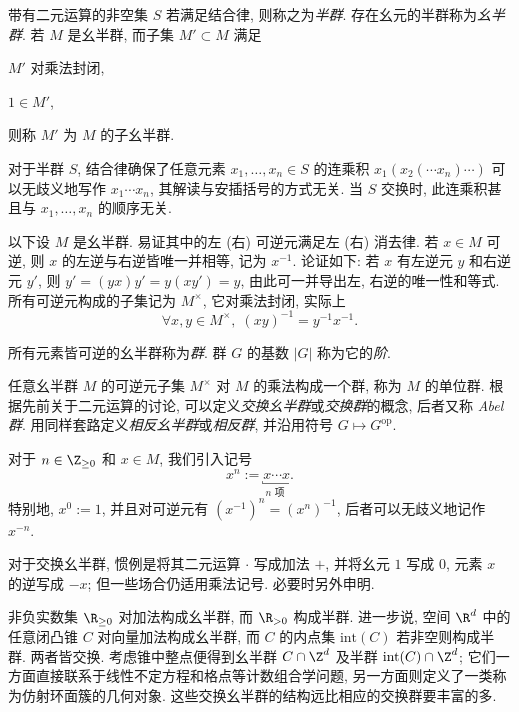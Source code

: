 \begin{definition}[半群与幺半群]\label{def:monoid}
	带有二元运算的非空集 $S$ 若满足结合律, 则称之为\emph{半群}. 存在幺元的半群称为\emph{幺半群}. 若 $M$ 是幺半群, 而子集 $M' \subset M$ 满足
	\begin{inparaenum}[(i)]
		\item $M'$ 对乘法封闭,
		\item $1 \in M'$,
	\end{inparaenum}
	则称 $M'$ 为 $M$ 的子幺半群.
\end{definition}

对于半群 $S$, 结合律确保了任意元素 $x_1, \ldots, x_n \in S$ 的连乘积 $x_1(x_2 (\cdots x_n)\cdots)$ 可以无歧义地写作 $x_1 \cdots x_n$, 其解读与安插括号的方式无关. 当 $S$ 交换时, 此连乘积甚且与 $x_1, \ldots, x_n$ 的顺序无关.

以下设 $M$ 是幺半群. 易证其中的左 (右) 可逆元满足左 (右) 消去律. 若 $x \in M$ 可逆, 则 $x$ 的左逆与右逆皆唯一并相等, 记为 $x^{-1}$. 论证如下: 若 $x$ 有左逆元 $y$ 和右逆元 $y'$, 则 $y' = (yx)y' =y (xy') = y$, 由此可一并导出左, 右逆的唯一性和等式. 所有可逆元构成的子集记为 $M^\times$, 它对乘法封闭, 实际上
\[ \forall x, y \in M^\times, \; (xy)^{-1} = y^{-1} x^{-1}. \]

\begin{definition}[群]\label{def:group}
	所有元素皆可逆的幺半群称为\emph{群}. 群 $G$ 的基数 $|G|$ 称为它的\emph{阶}.
\end{definition}

任意幺半群 $M$ 的可逆元子集 $M^\times$ 对 $M$ 的乘法构成一个群, 称为 $M$ 的单位群. 根据先前关于二元运算的讨论, 可以定义\emph{交换幺半群}或\emph{交换群}的概念, 后者又称 \emph{Abel 群}. 用同样套路定义\emph{相反幺半群}或\emph{相反群}, 并沿用符号 $G \mapsto G^\text{op}$.

对于 $n \in \Z_{\geq 0}$ 和 $x \in M$, 我们引入记号
\[ x^n := \underbracket{x \cdots x}_{n \text{ 项 }}. \]
特别地, $x^0 := 1$, 并且对可逆元有 $(x^{-1})^n = (x^n)^{-1}$, 后者可以无歧义地记作 $x^{-n}$.

\begin{convention}
	对于交换幺半群, 惯例是将其二元运算 $\cdot$ 写成加法 $+$, 并将幺元 $1$ 写成 $0$, 元素 $x$ 的逆写成 $-x$; 但一些场合仍适用乘法记号. 必要时另外申明.
\end{convention}

\begin{example}
	非负实数集 $\R_{\geq 0}$ 对加法构成幺半群, 而 $\R_{>0}$ 构成半群. 进一步说, 空间 $\R^d$ 中的任意闭凸锥 $C$ 对向量加法构成幺半群, 而 $C$ 的内点集 $\text{int}(C)$ 若非空则构成半群. 两者皆交换. 考虑锥中整点便得到幺半群 $C \cap \Z^d$ 及半群 $\text{int}(C) \cap \Z^d$; 它们一方面直接联系于线性不定方程和格点等计数组合学问题, 另一方面则定义了一类称为仿射环面簇的几何对象. 这些交换幺半群的结构远比相应的交换群要丰富的多.
\end{example}

